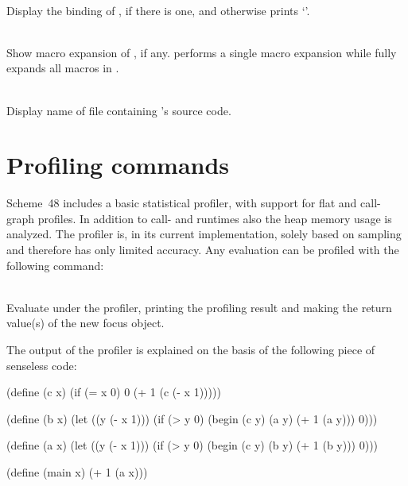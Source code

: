\begin{description}
\item {}\\
    Display the binding of , if there is one, and otherwise
    prints `'.
 
\item {}
\item {}\\
    Show macro expansion of , if any.
     performs a single macro expansion while
     fully expands all macros in .

\item {}\\
    Display name of file containing 's source code.
\end{description}


\section{Profiling commands}
\label{profiling-commands}

Scheme~48 includes a basic statistical profiler, with support for flat and call-graph profiles.
In addition to call- and runtimes also the heap memory usage is analyzed.
The profiler is, in its current implementation, solely based on sampling and therefore has only
limited accuracy.
Any evaluation can be profiled with the following command:

\begin{description}

\item {}\\
    Evaluate  under the profiler, printing the profiling result and making the
    return value(s) of  the new focus object.

\end{description}

The output of the profiler is explained on the basis of the following piece of senseless code:

\begin{example}
(define (c x)
  (if (= x 0)
      0
      (+ 1 (c (- x 1)))))

(define (b x)
  (let ((y (- x 1)))
    (if (> y 0)
        (begin
          (c y)
          (a y)
          (+ 1 (a y)))
        0)))

(define (a x)
  (let ((y (- x 1)))
    (if (> y 0)
        (begin
          (c y)
          (b y)
          (+ 1 (b y)))
        0)))

(define (main x)
  (+ 1 (a x)))
\end{example}

